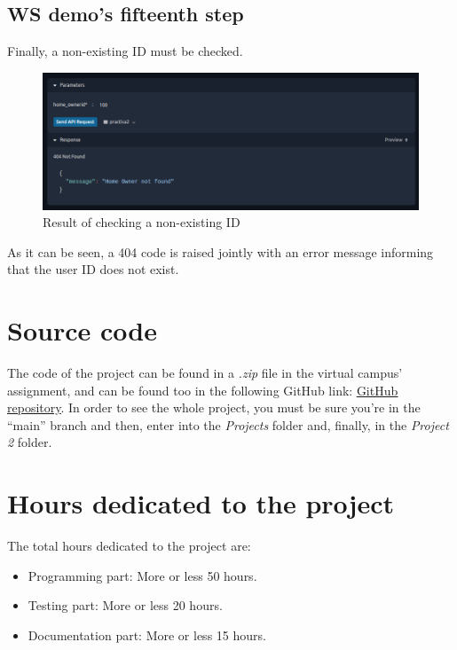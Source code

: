 \documentclass[a4paper,12pt]{article}
\begin{document}
\subsection*{WS demo's fifteenth step}
Finally, a non-existing ID must be checked.
\begin{figure}[H]
    \centering
    \includegraphics[scale = 0.5]{images/check id non existing.png}
    \caption{Result of checking a non-existing ID}
    \label{fig:idNoExist}
\end{figure}
As it can be seen, a 404 code is raised jointly with an error message informing that the user ID does not exist.
\newpage
\section*{Source code}
The code of the project can be found in a \textit{.zip} file in the virtual campus' assignment, and can be found too in the following GitHub link: \href{https://github.com/marc7666/Distributed-computing-course.git}{\underline{GitHub repository}}. In order to see the whole project, you must be sure you're in the “main” branch and then, enter into the \textit{Projects} folder and, finally, in the \textit{Project 2} folder.
\section*{Hours dedicated to the project}
The total hours dedicated to the project are:
\begin{itemize}
    \item Programming part: More or less 50 hours.
    \item Testing part: More or less 20 hours.
    \item Documentation part: More or less 15 hours.
\end{itemize}
\end{document}
